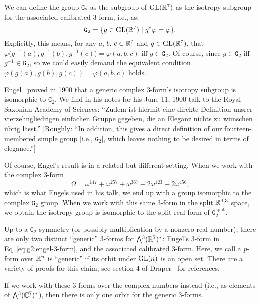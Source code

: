 \begin{definition}\label{defn:g2:isotropy-group-of-3-form}
We can define the group $\mathtt{G}_{2}$ as the subgroup of $\operatorname{GL}(\mathbb{R}^{7})$
as the isotropy subgroup for the associated calibrated 3-form, i.e., as:
\begin{equation}
\mathtt{G}_{2} = \{g\in\operatorname{GL}(\mathbb{R}^{7})\mid g^{*}\varphi=\varphi\}.
\end{equation}
Explicitly, this means, for any $a$, $b$, $c\in\mathbb{R}^{7}$ and $g\in\operatorname{GL}(\mathbb{R}^{7})$, that
$\varphi\bigl(g^{-1}(a), g^{-1}(b), g^{-1}(c)\bigr)=\varphi(a, b, c)$ iff $g\in\mathtt{G}_{2}$.
Of course, since $g\in\mathtt{G}_{2}$ iff $g^{-1}\in\mathtt{G}_{2}$, so
we could easily demand the equivalent condition
$\varphi(g(a),g(b),g(c))=\varphi(a,b,c)$ holds.
\end{definition}

\begin{remark}
Engel~\cite{engel1900:talk} proved in 1900 that a generic complex
3-form's isotropy subgroup is isomorphic to $\mathtt{G}_{2}$. We find in
his notes for his June 11, 1900 talk to the Royal Saxonian Academy of
Sciences: ``Zudem ist hiermit eine direkte Definition unsrer
vierzehngliedrigen einfachen Gruppe gegeben, die an Eleganz nichts zu
w\"{u}nschen \"{u}brig l\"{a}sst.'' [Roughly: 
  ``In addition, this gives a direct definition of our fourteen-membered
  simple group [i.e., $\mathtt{G}_{2}$], which leaves nothing to be
  desired in terms of elegance.'']

Of course, Engel's result is in a related-but-different setting.
When we work with the complex 3-form
\begin{equation}\label{eq:g2:engel-3-form}
\Omega = \omega^{147} + \omega^{257} + \omega^{367} - 2\omega^{123}+2\omega^{456},
\end{equation}
which is what Engels used in his talk, we end up with a group isomorphic
to the complex $\mathtt{G}_{2}$ group. When we work with this same
3-form in the split $\mathbb{R}^{4,3}$ space, we obtain the isotropy group is
isomorphic to the split real form of $\mathtt{G}_{2}^{\text{split}}$. 
\end{remark}

\begin{remark}
Up to a $\mathtt{G}_{2}$ symmetry (or possibly multiplication by a
nonzero real number), there are only two distinct
``generic'' 3-forms for $\Exterior^{3}(\RR^{7})^{*}$: Engel's 3-form in
Eq~\eqref{eq:g2:engel-3-form}, and the associated calibrated
3-form. Here, we call a $p$-form over $\mathbb{R}^{n}$ is ``generic'' if its
orbit under $\operatorname{GL}(n)$ is an open set. There are a variety of proofs for
this claim, see section 4 of Draper~\cite{draper:2017g2} for references.

If we work with these 3-forms over the complex numbers instead (i.e., as
elements of $\Exterior^{3}(\CC^{7})^{*}$), then there is only one orbit
for the generic 3-forms.
\end{remark}

